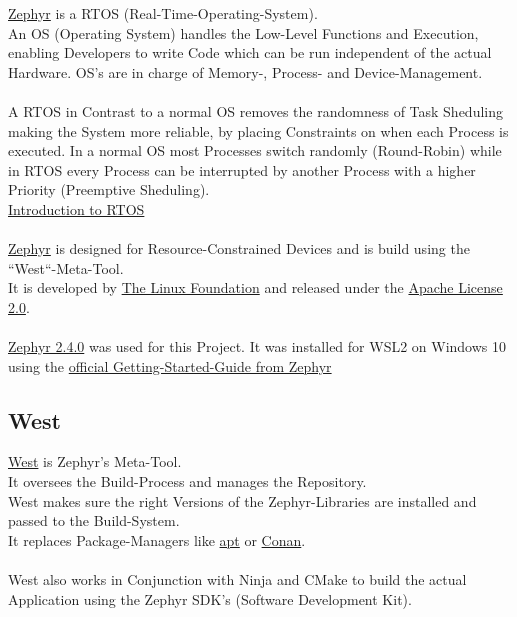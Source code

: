\href{https://zephyrproject.org/}{Zephyr} is a RTOS (Real-Time-Operating-System).
\\
An OS (Operating System) handles the Low-Level Functions and Execution, enabling
Developers to write Code which can be run independent of the actual Hardware.
OS's are in charge of Memory-, Process- and Device-Management.
\\
\\
A RTOS in Contrast to a normal OS removes the randomness of Task Sheduling
making the System more reliable, by placing Constraints on when each Process
is executed. In a normal OS most Processes switch randomly (Round-Robin) while in RTOS
every Process can be interrupted by another Process with a higher Priority (Preemptive Sheduling).
\\
\href{https://predictabledesigns.com/introduction-to-real-time-operating-systems-rtos-for-use-in-embedded-systems/}
{Introduction to RTOS}
\\
\\
\href{https://zephyrproject.org/}{Zephyr} is designed for Resource-Constrained
Devices and is build using the ``West``-Meta-Tool.
\\
It is developed by
\href{https://www.linuxfoundation.org/}
{The Linux Foundation} and released under the
\href{https://www.apache.org/licenses/LICENSE-2.0.html}
{Apache License 2.0}.
\\
\\
\href{https://docs.zephyrproject.org/2.4.0/index.html}
{Zephyr 2.4.0} was used for this Project.
It was installed for WSL2 on Windows 10 using the
\href{https://docs.zephyrproject.org/2.4.0/getting_started/index.html}
{official Getting-Started-Guide from Zephyr}

\subsection{West}

\href{https://docs.zephyrproject.org/2.4.0/guides/west/index.html}
{West} is Zephyr's Meta-Tool.
\\
It oversees the Build-Process and manages the Repository.
\\
West makes sure the right Versions of the Zephyr-Libraries are installed and
passed to the Build-System.
\\
It replaces Package-Managers like
\href{https://en.wikipedia.org/wiki/APT_(software)}{apt}
or
\href{https://conan.io/}{Conan}.
\\
\\
West also works in Conjunction with Ninja and CMake to build the actual Application
using the Zephyr SDK's (Software Development Kit).

